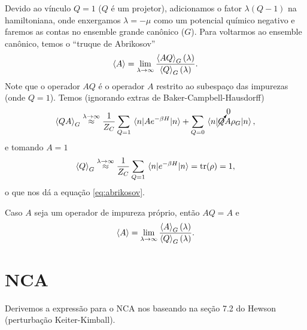 \documentclass[a4paper,fleqn,12pt]{article}
\begin{document}
Devido ao vínculo $Q = 1$ ($Q$ é um projetor), adicionamos o fator $\lambda (Q - 1)$ na hamiltoniana, onde enxergamos $\lambda = -\mu$ como um potencial químico negativo e faremos as contas no ensemble grande canônico ($G$). Para voltarmos ao ensemble canônico, temos o ``truque de Abrikosov''
\begin{equation} \label{eq:abrikosov}
\ev{A} = \lim_{\lambda \to \infty} \frac{\ev{AQ}_G(\lambda)}{\ev{Q}_G(\lambda)}.
\end{equation}
Note que o operador $AQ$ é o operador $A$ restrito ao subespaço das impurezas (onde $Q = 1$). Temos (ignorando extras de Baker-Campbell-Hausdorff)
$$
\ev{QA}_G \stackrel{\lambda \to \infty}{\approx}
\frac{1}{Z_C} \sum_{Q = 1} \mel{n}{Ae^{-\beta H}}{n} +
\sum_{Q = 0} \mel{n}{\cancelto{0}{Q}A\rho_G}{n},
$$
e tomando $A = 1$
$$
\ev{Q}_G \stackrel{\lambda \to \infty}{\approx}
\frac{1}{Z_C} \sum_{Q = 1} \mel{n}{e^{-\beta H}}{n} = \tr(\rho) = 1,
$$
o que nos dá a equação \ref{eq:abrikosov}.

Caso $A$ seja um operador de impureza próprio, então $AQ = A$ e
\begin{equation} \label{eq:abrikosov-imp}
\ev{A} = \lim_{\lambda \to \infty} \frac{\ev{A}_G(\lambda)}{\ev{Q}_G(\lambda)}.
\end{equation}


\section{NCA}

Derivemos a expressão para o NCA nos baseando na seção 7.2 do Hewson (perturbação Keiter-Kimball).
\end{document}
